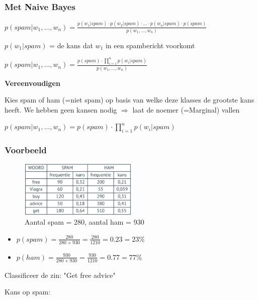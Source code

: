 \documentclass{article}
\begin{document}
\subsubsection{Met Naive Bayes}

\begin{center}
    $p(spam | w_1, \dots, w_n) = \frac{p(w_1 | spam) \cdot p(w_2 | spam) \cdot \dots \cdot p(w_n | spam) \cdot p(spam)}{p(w_1, \dots, w_n)}$
\end{center}

$p(w_1 | spam)$ = de kans dat $w_1$ in een spambericht voorkomt

\begin{center}
    $p(spam | w_1, \dots, w_n) = \frac{p(spam) \cdot \prod_{i=1}^n p(w_i | spam)}{p(w_1, \dots, w_n)}$
\end{center}

\textbf{Vereenvoudigen}

Kies spam of ham (=niet spam) op basis van welke deze klasses de grootste kans heeft.
We hebben geen kansen nodig $\Rightarrow$ laat de noemer (=Marginal) vallen

$p(spam | w_1, \dots, w_n) = p(spam) \cdot \prod_{i=1}^n p(w_i | spam)$

\subsubsection{Voorbeeld}

\begin{figure}[H]
    \centering
    \includegraphics[width=0.5\textwidth]{spamdetectie-voorbeeld.png}
    \caption{Aantal spam = 280, aantal ham = 930}
\end{figure}

\begin{itemize}
    \item $p(spam) = \frac{280}{280 + 930} = \frac{280}{1210} = 0.23 = 23\%$
    \item $p(ham) = \frac{930}{280 + 930} = \frac{930}{1210} = 0.77 = 77\%$
\end{itemize}

Classificeer de zin: "Get free advice"

Kans op spam:
\end{document}
